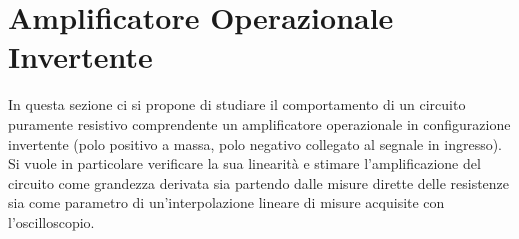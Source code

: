 \documentclass[a4paper,11pt]{article} %
\begin{document}
%			
%			
%			
%			
%
%
%		
%
%			
%			
%
%			
%			
%
%	



\section{Amplificatore Operazionale Invertente}\label{s:opamp}
In questa sezione ci si propone di studiare il comportamento di un circuito puramente resistivo comprendente un
amplificatore operazionale in configurazione invertente (polo positivo a massa, polo negativo collegato al segnale in
ingresso). Si vuole in particolare verificare la sua linearità e stimare l'amplificazione del circuito come grandezza
derivata sia partendo dalle misure dirette delle resistenze sia come parametro di un'interpolazione lineare di misure
acquisite con l'oscilloscopio. 
\end{document}
